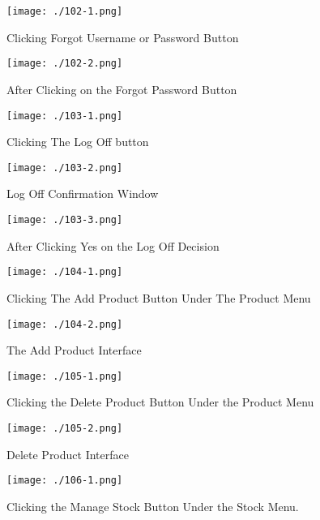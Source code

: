 \begin{figure}[H]
    \texttt{[image: ./102-1.png]}
    \caption{Clicking Forgot Username or Password Button} \label{fig:102-1}
\end{figure}

\begin{figure}[H]
    \texttt{[image: ./102-2.png]}
    \caption{After Clicking on the Forgot Password Button } \label{fig:102-2}
\end{figure}

\begin{figure}[H]
    \texttt{[image: ./103-1.png]}
    \caption{Clicking The Log Off button} \label{fig:103-1}
\end{figure}

\begin{figure}[H]
    \texttt{[image: ./103-2.png]}
    \caption{Log Off Confirmation Window} \label{fig:103-2}
\end{figure}

\begin{figure}[H]
    \texttt{[image: ./103-3.png]}
    \caption{After Clicking Yes on the Log Off Decision} \label{fig:103-3}
\end{figure}

\begin{figure}[H]
    \texttt{[image: ./104-1.png]}
    \caption{Clicking The Add Product Button Under The Product Menu} \label{fig:104-1}
\end{figure}

\begin{figure}[H]
    \texttt{[image: ./104-2.png]}
    \caption{The Add Product Interface} \label{fig:104-2}
\end{figure}

\begin{figure}[H]
    \texttt{[image: ./105-1.png]}
    \caption{Clicking the Delete Product Button Under the Product Menu} \label{fig:105-1}
\end{figure}

\begin{figure}[H]
    \texttt{[image: ./105-2.png]}
    \caption{Delete Product Interface} \label{fig:105-2}
\end{figure}

\begin{figure}[H]
    \texttt{[image: ./106-1.png]}
    \caption{Clicking the Manage Stock Button Under the Stock Menu.} \label{fig:106-1}
\end{figure}

